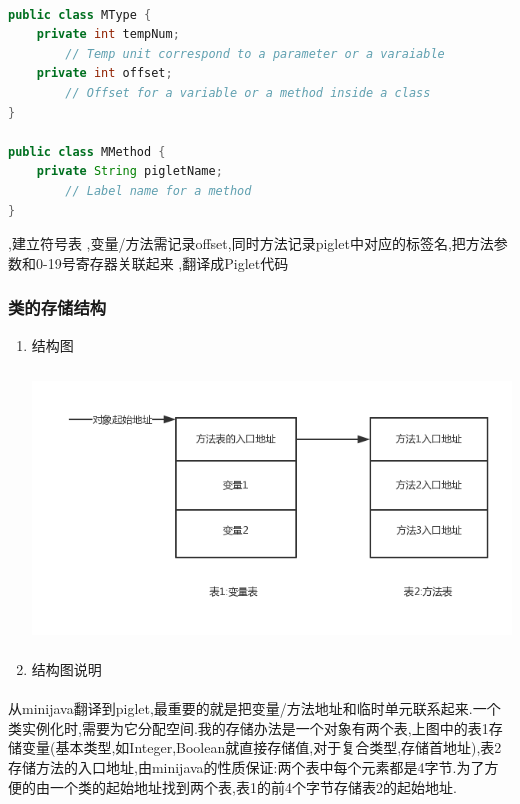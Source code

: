 \documentclass[11pt, oneside]{article}   	%
\begin{document}
\begin{spacing}{1.55}
\begin{enumerate}
	\paragraph{}
	\begin{lstlisting}[language=Java]
public class MType {
	private int tempNum; 
		// Temp unit correspond to a parameter or a varaiable
	private int offset; 
		// Offset for a variable or a method inside a class
} 

public class MMethod {
	private String pigletName; 
		// Label name for a method
}
	\end{lstlisting}
	,建立符号表
	,变量/方法需记录offset,同时方法记录piglet中对应的标签名,把方法参数和0-19号寄存器关联起来
	,翻译成Piglet代码
	\end{enumerate}
	\subsubsection{类的存储结构}
	\begin{enumerate}
	\item{结构图}
	\paragraph{}
	\includegraphics[height=200pt]{2.png}
	\item{结构图说明}
	\end{enumerate}
	\paragraph{}
	从minijava翻译到piglet,最重要的就是把变量/方法地址和临时单元联系起来.一个类实例化时,需要为它分配空间.我的存储办法是一个对象有两个表,上图中的表1存储变量(基本类型,如Integer,Boolean就直接存储值,对于复合类型,存储首地址),表2存储方法的入口地址,由minijava的性质保证:两个表中每个元素都是4字节.为了方便的由一个类的起始地址找到两个表,表1的前4个字节存储表2的起始地址.

\end{spacing}
\end{document}
